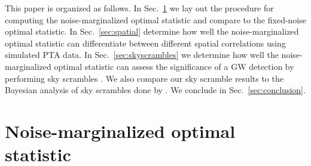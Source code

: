 \documentclass[twocolumn,aps,prd,superscriptaddress]{revtex4-1}
\begin{document}
This paper is organized as follows. In Sec.~\ref{sec:marg_os} 
we lay out the procedure for computing the noise-marginalized optimal statistic 
and compare to the fixed-noise optimal statistic. 
In Sec.~\ref{sec:spatial} determine how well 
the noise-marginalized optimal statistic can 
differentiate between different spatial correlations 
using simulated PTA data. 
In Sec.~\ref{sec:skyscrambles} we determine how well the noise-marginalized optimal statistic 
can assess the significance of a GW detection by performing sky scrambles \citep{cs2016}. 
We also compare our sky scramble results to the Bayesian analysis of sky scrambles done by \citet{tlb+2017}. 
We conclude in Sec.~\ref{sec:conclusion}.


\section{Noise-marginalized optimal statistic}
\label{sec:marg_os}
\end{document}
